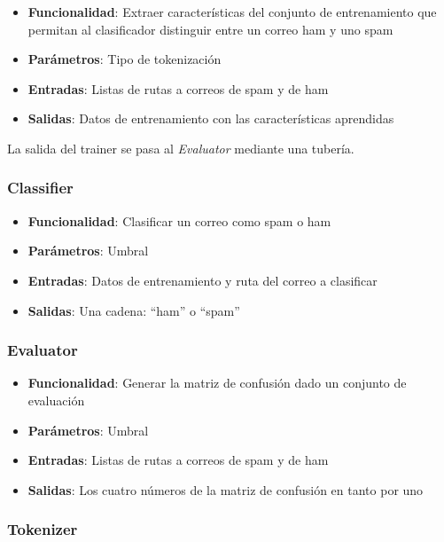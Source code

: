 \begin{itemize}
	\item \textbf{Funcionalidad}: Extraer características del conjunto de
		entrenamiento que permitan al clasificador distinguir entre un
		correo ham y uno spam
	\item \textbf{Parámetros}: Tipo de tokenización
	\item \textbf{Entradas}: Listas de rutas a correos de spam y de ham
	\item \textbf{Salidas}: Datos de entrenamiento con las características
		aprendidas
\end{itemize}

La salida del trainer se pasa al \textit{Evaluator} mediante una tubería.

\subsubsection{Classifier}

\begin{itemize}
	\item \textbf{Funcionalidad}: Clasificar un correo como spam o ham
	\item \textbf{Parámetros}: Umbral
	\item \textbf{Entradas}: Datos de entrenamiento y ruta del correo a
		clasificar
	\item \textbf{Salidas}: Una cadena: ``ham'' o ``spam''
\end{itemize}

\subsubsection{Evaluator}

\begin{itemize}
	\item \textbf{Funcionalidad}: Generar la matriz de confusión dado un
		conjunto de evaluación
	\item \textbf{Parámetros}: Umbral
	\item \textbf{Entradas}: Listas de rutas a correos de spam y de ham
	\item \textbf{Salidas}: Los cuatro números de la matriz de confusión en
		tanto por uno
\end{itemize}

\subsubsection{Tokenizer}

